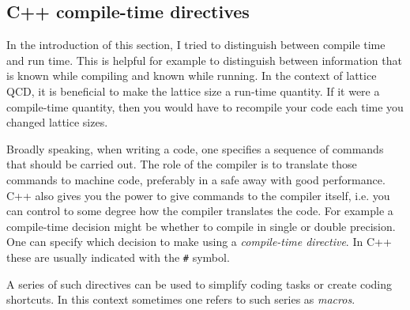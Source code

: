 \subsection{C++ compile-time directives}

In the introduction of this section, I tried to distinguish between compile time
and run time. This is helpful for example to distinguish between information
that is known while compiling and known while running. In the context of lattice
QCD, it is beneficial to make the lattice size a run-time quantity. If it were a
compile-time quantity, then you would have to recompile your code each time you
changed lattice sizes.

Broadly speaking, when writing a code, one specifies a sequence of commands that
should be carried out. The role of the compiler is to translate those commands
to machine code, preferably in a safe away with good performance. C++ also gives
you the power to give commands to the compiler itself, i.e. you can control to
some degree how the compiler translates the code. For example a compile-time
decision might be whether to compile in single or double precision. One can
specify which decision to make using a {\it compile-time
directive}.
In C++ these are usually indicated with the \texttt{\#} symbol.

A series of such directives can be used to simplify coding tasks or create
coding shortcuts. In this context sometimes one refers to such series as {\it
macros}.



